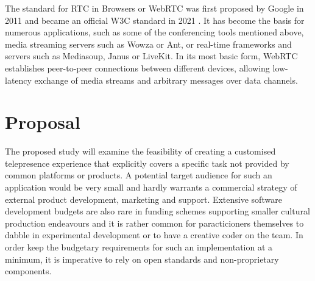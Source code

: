 The standard for \ac{RTC} in Browsers or \ac{WebRTC} \parencite{webRtcSpec} was first proposed by Google in 2011 and became an official \ac{W3C} standard in 2021 \parencite{webRtcOfficialWebStandard}.
It has become the basis for numerous applications, such as some of the conferencing tools mentioned above, media streaming servers such as Wowza or Ant, or real-time frameworks and servers such as Mediasoup, Janus or LiveKit.
In its most basic form, \ac{WebRTC} establishes peer-to-peer connections between different devices, allowing low-latency exchange of media streams and arbitrary messages over data channels.

\section{Proposal}

The proposed study will examine the feasibility of creating a customised telepresence experience that explicitly covers a specific task not provided by common platforms or products.
A potential target audience for such an application would be very small and hardly warrants a commercial strategy of external product development, marketing and support.
Extensive software development budgets are also rare in funding schemes supporting smaller cultural production endeavours and it is rather common for paracticioners themselves to dabble in experimental development or to have a creative coder on the team.
In order keep the budgetary requirements for such an implementation at a minimum, it is imperative to rely on open standards and non-proprietary components.

